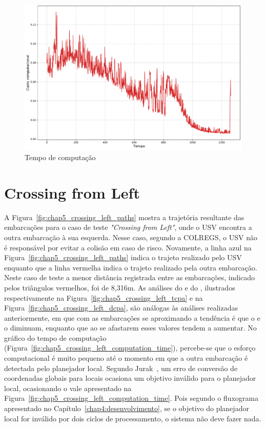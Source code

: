         \begin{figure}[H]
            \centering
            \includegraphics[width=\textwidth]{fig/chap5/overtake_computation_time.pdf}
            \caption{Tempo de computação}
            \label{fig:chap5_overtake_computation_time}
        \end{figure}
        
    \section{Crossing from Left} \label{subchap5_crossing_from_left}
        A Figura~\ref{fig:chap5_crossing_left_paths} mostra a trajetória resultante das embarcações para o caso de teste \textit{"Crossing from Left"}, onde o USV encontra a outra embarcação à sua esquerda. Nesse caso, segundo a COLREGS, o USV não é responsável por evitar a colisão em caso de risco. Novamente, a linha azul na Figura~\ref{fig:chap5_crossing_left_paths} indica o trajeto realizado pelo USV enquanto que a linha vermelha indica o trajeto realizado pela outra embarcação. Neste caso de teste a menor distância registrada entre as embarcações, indicado pelos triângulos vermelhos, foi de 8,316m. As análises do \tcpa e do \dcpa, ilustrados respectivamente na 
        Figura~\ref{fig:chap5_crossing_left_tcpa} e na Figura~\ref{fig:chap5_crossing_left_dcpa}, são análogas às análises realizadas anteriormente, em que com as embarcações se aproximando a tendência é que o \tcpa e o \dcpa diminuam, enquanto que ao se afastarem esses valores tendem a aumentar. No gráfico do tempo de computação (Figura~\ref{fig:chap5_crossing_left_computation_time}), percebe-se que o esforço computacional é muito pequeno até o momento em que a outra embarcação é detectada pelo planejador local. Segundo Jurak~\cite{Jurak2020COLREGS}, um erro de conversão de coordenadas globais para locais ocasiona um objetivo inválido para o planejador local, ocasionando o vale apresentado na Figura~\ref{fig:chap5_crossing_left_computation_time}. Pois segundo o fluxograma apresentado no 
        Capítulo~\ref{chap4:desenvolvimento}, se o objetivo do planejador local for inválido por dois ciclos de processamento, o sistema não deve fazer nada.
    
